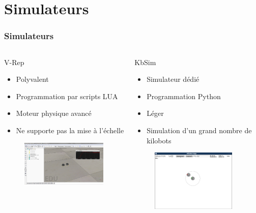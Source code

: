 \documentclass[xcolor=table]{beamer}
\begin{document}
\section{Simulateurs}
\begin{frame}
  \frametitle{Simulateurs}
  \begin{columns}[T] %
    \begin{column}{.48\textwidth}
      \Large V-Rep
      \begin{itemize}
        \item[\ding{51}] Polyvalent
        \item[\ding{51}] Programmation par scripts LUA
        \item[\ding{51}] Moteur physique avanc\'e
        \item[\ding{55}] Ne supporte pas la mise \`a l'\'echelle
      \end{itemize}
      \begin{figure}[!h]
        \includegraphics[width=5cm]{V-Rep.png}
      \end{figure}
    \end{column}%
    \hfill%
    \begin{column}{.48\textwidth}
      \Large KbSim
      \begin{itemize}
        \item[\ding{51}] Simulateur d\'edi\'e
        \item[\ding{51}] Programmation Python
        \item[\ding{51}] L\'eger
        \item[\ding{51}] Simulation d'un grand nombre de kilobots
      \end{itemize}
      \begin{figure}[!h]
        \includegraphics[width=4cm]{KbSim.png}
      \end{figure}
    \end{column}%
  \end{columns}
\end{frame}
\end{document}
